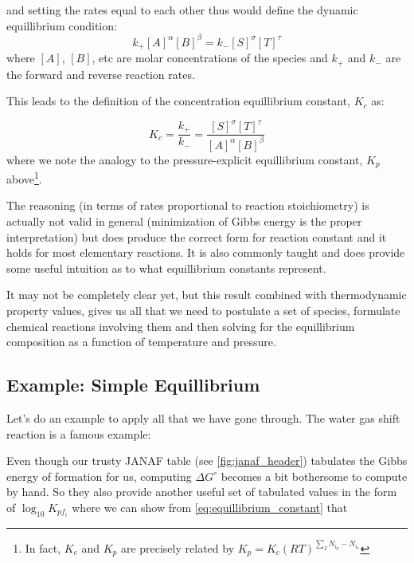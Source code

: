 \documentclass[twocolumn]{memoir} %
\makeatletter
\newcommand\reaction@[1]{\begin{equation}\ce{#1}\end{equation}}
\newcommand\reaction@nonumber[1]%
        {\begin{equation*}\ce{#1}\end{equation*}}
\newcommand\reaction{\@ifstar{\reaction@nonumber}{\reaction@}}
\makeatother
\begin{document}
\reaction{$\alpha$ A + $\beta$ B <-> $\sigma$ S + $\tau$ T}
%
and setting the rates equal to each other thus would define the dynamic equillibrium condition:
\begin{equation*}
    k_+[A]^\alpha[B]^\beta = k_-[S]^\sigma[T]^\tau
\end{equation*}
where $[A]$, $[B]$, etc are molar concentrations of the species and $k_+$ and $k_-$ are the forward
and reverse reaction rates.

This leads to the definition of the concentration equillibrium constant, $K_c$ as:

\begin{equation*}
    K_c = \frac{k_+}{k_-} = \frac{[S]^\sigma[T]^\tau}{[A]^\alpha[B]^\beta}
\end{equation*}
%
where we note the analogy to the pressure-explicit equillibrium constant, $K_p$ above\footnote{In fact, $K_c$ 
and $K_p$ are precisely related by $K_p = K_c(RT)^{\sum\limits_IN_{i_p}-N_{i_r}}$}.  

The reasoning (in terms of rates proportional to reaction stoichiometry) is actually not valid in 
general (minimization of Gibbs energy is the proper interpretation) but does produce the correct 
form for reaction constant and it holds for most elementary
reactions.  It is also commonly taught and does provide some useful intuition as to what
equillibrium constants represent.

It may not be completely clear yet, but this result combined with thermodynamic property values,
gives us all that we need to postulate a set of species, formulate chemical reactions involving
them and then solving for the equillibrium composition as a function of temperature and pressure.

\subsection{Example: Simple Equillibrium}
Let's do an example to apply all that we have gone through.  The water gas shift reaction is a famous
example:

\reaction{CO + H2O <-> CO2 + H2}

Even though our trusty JANAF table (see \cref{fig:janaf_header}) tabulates the Gibbs energy of formation
for us, computing $\Delta G^{\circ}$ becomes a bit bothersome to compute by hand. So they also provide another useful
set of tabulated values in the form of $\log_{10} K_{pf_i}$ where we can show from \cref{eq:equillibrium_constant}
that
\end{document}
